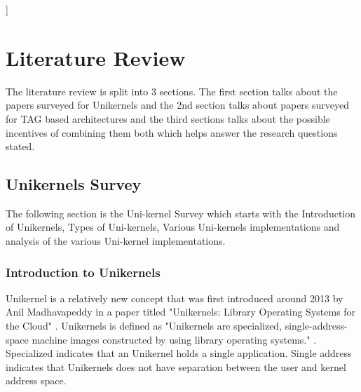 ]%

\chapter{Literature Review}  %

\ifpdf
    \graphicspath{{LiteratureReview/Figs/Raster/}{LiteratureReview/Figs/PDF/}{LiteratureReview/Figs/}}
\else
    \graphicspath{{LiteratureReview/Figs/}{LiteratureReview/Figs/}}
\fi


The literature review is split into 3 sections. The first section talks about the papers surveyed 
for Unikernels and the 2nd section talks about papers surveyed for TAG based architectures and 
the third sections talks about the possible incentives of combining them both which helps 
answer the research questions stated.

\section[Unikernels]{Unikernels Survey}
The following section is the Uni-kernel Survey which starts 
with the Introduction of Unikernels, Types of Uni-kernels, 
Various Uni-kernels implementations and analysis 
of the various Uni-kernel implementations. 

\subsection{Introduction to Unikernels}
Unikernel is a relatively new concept that was first introduced around 2013 by Anil Madhavapeddy in a 
paper titled "Unikernels: Library Operating Systems for the Cloud" \cite{FirstUnikernelPaper}. Unikernels 
is defined as "Unikernels are specialized, single-address-space machine images constructed by using library 
operating systems." \cite{UnikernelDefinition}. Specialized indicates that an Unikernel holds a single application.
Single address indicates that Unikernels does not have separation between the user and kernel address 
space. 

